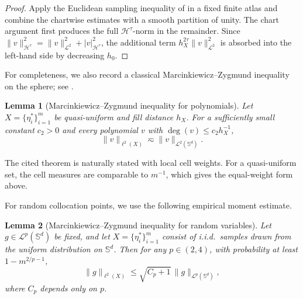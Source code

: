 \documentclass{article}
\numberwithin{equation}{section}
\newtheorem{lemma}{Lemma}
\def\SS{\mathbb{S}}
\begin{document}
\begin{proof}
Apply the Euclidean sampling inequality of \cite{arcangeli2014sampling} in a fixed finite atlas and combine the chartwise estimates with a smooth partition of unity. The chart argument first produces the full $\mathcal H^\tau$-norm in the remainder. Since $\|v\|_{\mathcal H^\tau}^2=\|v\|_{\mathcal L^2}^2+|v|_{\mathcal H^\tau}^2$, the additional term $h_X^{2\tau}\|v\|_{\mathcal L^2}^2$ is absorbed into the left-hand side by decreasing $h_0$.
\end{proof}

For completeness, we also record a classical Marcinkiewicz--Zygmund inequality on the sphere; see \cite[Theorem 3.1]{mhaskar2001spherical}.

\begin{lemma}[Marcinkiewicz–Zygmund inequality for polynomials]\label{lem_MZ_L2}
Let $X=\{\eta_i^*\}_{i=1}^m$ be quasi-uniform and fill distance $h_X$. For a sufficiently small constant $c_2>0$ and every polynomial $v$ with $\deg(v)\leq c_2h_X^{-1}$,
    \begin{equation}
        \|v\|_{\ell^2(X)}\eqsim\|v\|_{\mathcal{L}^2(\SS^d)}.
    \end{equation}
\end{lemma}
The cited theorem is naturally stated with local cell weights. For a quasi-uniform set, the cell measures are comparable to $m^{-1}$, which gives the equal-weight form above.

For random collocation points, we use the following empirical moment estimate.

\begin{lemma}[Marcinkiewicz–Zygmund inequality for random variables]\label{lem_rand_l2Lp}
    Let $g\in\mathcal L^p(\SS^d)$ be fixed, and let $X = \{\eta_i^*\}_{i=1}^m$ consist of i.i.d.\ samples drawn from the uniform distribution on $\mathbb{S}^d$. Then for any $p\in(2,4)$, with probability at least $1-m^{2/p-1}$,
    \begin{equation}
        \|g\|_{\ell^2(X)}\leq\sqrt{C_p+1}\,\|g\|_{\mathcal{L}^p(\SS^d)},
    \end{equation}
    where $C_p$ depends only on $p$.
\end{lemma}
\end{document}
